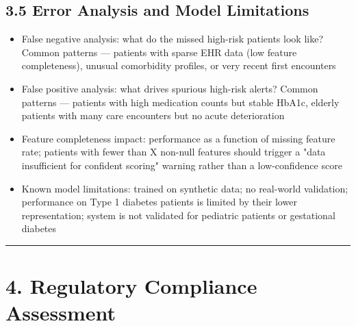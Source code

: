 \documentclass[11pt,a4paper]{article}
\begin{document}
\subsection{3.5 Error Analysis and Model Limitations}
\begin{itemize}
\item False negative analysis: what do the missed high-risk patients look like? Common patterns --- patients with sparse EHR data (low feature completeness), unusual comorbidity profiles, or very recent first encounters
\item False positive analysis: what drives spurious high-risk alerts? Common patterns --- patients with high medication counts but stable HbA1c, elderly patients with many care encounters but no acute deterioration
\item Feature completeness impact: performance as a function of missing feature rate; patients with fewer than X non-null features should trigger a "data insufficient for confident scoring" warning rather than a low-confidence score
\item Known model limitations: trained on synthetic data; no real-world validation; performance on Type 1 diabetes patients is limited by their lower representation; system is not validated for pediatric patients or gestational diabetes
\end{itemize}

\noindent\rule{\linewidth}{0.4pt}

\section{4. Regulatory Compliance Assessment}
\end{document}
